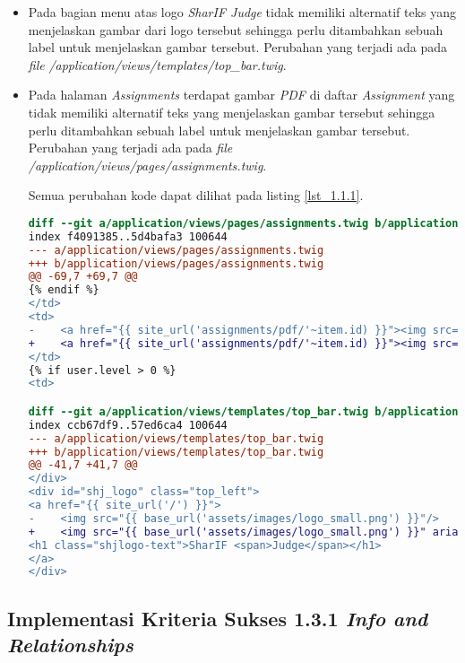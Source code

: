 \begin{itemize}
	\item Pada bagian menu atas logo \textit{SharIF Judge} tidak memiliki alternatif teks yang menjelaskan gambar dari logo tersebut sehingga perlu ditambahkan sebuah label untuk menjelaskan gambar tersebut. Perubahan yang terjadi ada pada \textit{file} \textit{/application/views/templates/top\_bar.twig}.

	\item Pada halaman \textit{Assignments} terdapat gambar \textit{PDF} di daftar \textit{Assignment} yang tidak memiliki alternatif teks yang menjelaskan gambar tersebut sehingga perlu ditambahkan sebuah label untuk menjelaskan gambar tersebut. Perubahan yang terjadi ada pada \textit{file} \textit{/application/views/pages/assignments.twig}.
	
	Semua perubahan kode dapat dilihat pada listing \ref{lst_1.1.1}.
	
\begin{lstlisting}[language=diff, caption=Perubahan untuk mematuhi kriteria 1.1.1, label=lst_1.1.1, basicstyle=\ttfamily, frame=single,
columns=fullflexible, keepspaces=true, breaklines=true]
diff --git a/application/views/pages/assignments.twig b/application/views/pages/assignments.twig
index f4091385..5d4bafa3 100644
--- a/application/views/pages/assignments.twig
+++ b/application/views/pages/assignments.twig
@@ -69,7 +69,7 @@
{% endif %}
</td>
<td>
-    <a href="{{ site_url('assignments/pdf/'~item.id) }}"><img src="{{ base_url('assets/images/pdf.svg') }}" /></a>
+    <a href="{{ site_url('assignments/pdf/'~item.id) }}"><img src="{{ base_url('assets/images/pdf.svg') }}" aria-label="Download PDF For Assignment {{ item.name }}"/></a>
</td>
{% if user.level > 0 %}
<td>

diff --git a/application/views/templates/top_bar.twig b/application/views/templates/top_bar.twig
index ccb67df9..57ed6ca4 100644
--- a/application/views/templates/top_bar.twig
+++ b/application/views/templates/top_bar.twig
@@ -41,7 +41,7 @@
</div>
<div id="shj_logo" class="top_left">
<a href="{{ site_url('/') }}">
-    <img src="{{ base_url('assets/images/logo_small.png') }}"/>
+    <img src="{{ base_url('assets/images/logo_small.png') }}" aria-label="Logo SharIF Judge"/>
<h1 class="shjlogo-text">SharIF <span>Judge</span></h1>
</a>
</div>
\end{lstlisting}

\end{itemize}

\subsection{Implementasi Kriteria Sukses 1.3.1 \textit{Info and Relationships}}
\label{subsec:implementasi_A_1.3.1}


